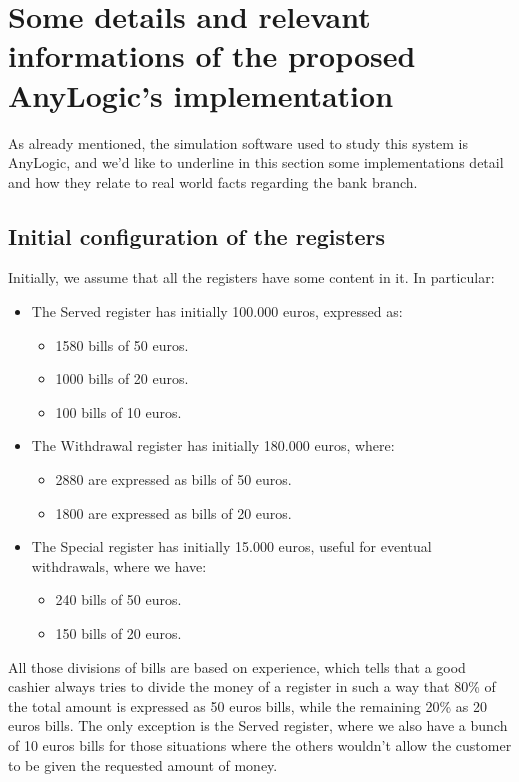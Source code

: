 \documentclass{article}
\begin{document}
\section{Some details and relevant informations of the proposed AnyLogic's implementation}
As already mentioned, the simulation software used to study this system is AnyLogic, and we'd like to underline in this section some implementations detail and how they relate to real world facts regarding the bank branch.
\subsection{Initial configuration of the registers}
Initially, we assume that all the registers have some content in it. In particular:
\begin{itemize}
    \item The Served register has initially 100.000 euros, expressed as:
    \begin{itemize}
        \item 1580 bills of 50 euros.
        \item 1000 bills of 20 euros.
        \item 100 bills of 10 euros.
    \end{itemize}
    \item The Withdrawal register has initially 180.000 euros, where:
    \begin{itemize}
        \item 2880 are expressed as bills of 50 euros.
        \item 1800 are expressed as bills of 20 euros.
    \end{itemize}
    \item The Special register has initially 15.000 euros, useful for eventual withdrawals, where we have:
    \begin{itemize}
        \item 240 bills of 50 euros.
        \item 150 bills of 20 euros.
    \end{itemize}
\end{itemize}
All those divisions of bills are based on experience, which tells that a good cashier always tries to divide the money of a register in such a way that 80\% of the total amount is expressed as 50 euros bills, while the remaining 20\% as 20 euros bills. The only exception is the Served register, where we also have a bunch of 10 euros bills for those situations where the others wouldn't allow the customer to be given the requested amount of money.
\end{document}
